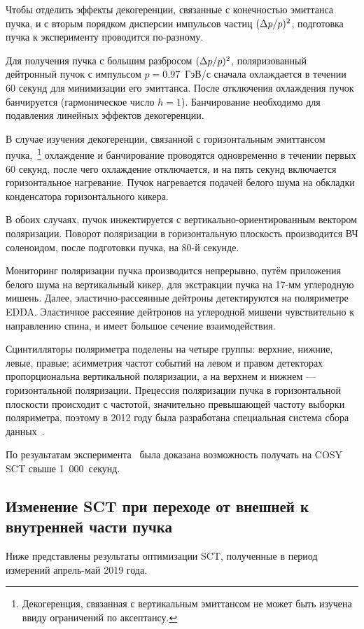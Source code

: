 Чтобы отделить эффекты декогеренции, связанные с конечностью эмиттанса пучка, и с вторым порядком дисперсии импульсов частиц $(\Delta p/p)^2$, подготовка пучка к эксперименту проводится по-разному.

Для получения пучка с большим разбросом $(\Delta p/p)^2$, поляризованный дейтронный пучок с импульсом $p=0.97$~ГэВ/с сначала охлаждается в течении 60 секунд для минимизации его эмиттанса. После отключения охлаждения пучок банчируется (гармоническое число $h=1$). Банчирование необходимо для подавления линейных эффектов декогеренции.

В случае изучения декогеренции, связанной с горизонтальным эмиттансом пучка,~\footnote{Декогеренция, связанная с вертикальным эмиттансом не может быть изучена ввиду ограничений по аксептансу.} охлаждение и банчирование проводятся одновременно в течении первых 60 секунд, после чего охлаждение отключается, и на пять секунд включается горизонтальное нагревание. Пучок нагревается подачей белого шума на обкладки конденсатора горизонтального кикера.

В обоих случаях, пучок инжектируется с вертикально-ориентированным вектором поляризации. Поворот поляризации в горизонтальную плоскость производится ВЧ соленоидом, после подготовки пучка, на 80-й секунде.

Мониторинг поляризации пучка производится непрерывно, путём приложения белого шума на вертикальный кикер, для экстракции пучка на 17-мм углеродную мишень. Далее, эластично-рассеянные дейтроны детектируются на поляриметре EDDA. Эластичное рассеяние дейтронов на углеродной мишени чувствительно к направлению спина, и имеет большое сечение взаимодействия. 

Сцинтилляторы поляриметра поделены на четыре группы: верхние, нижние, левые, правые; асимметрия частот событий на левом и правом детекторах пропорциональна вертикальной поляризации, а на верхнем и нижнем --- горизонтальной поляризации. Прецессия поляризации пучка в горизонтальной плоскости происходит с частотой, значительно превышающей частоту выборки поляриметра, поэтому в 2012 году была разработана специальная система сбора данных~\cite{COSY:DAQ}.

По результатам эксперимента~\cite{Guidoboni:STORI14} была доказана возможность получать на COSY SCT 
свыше 1~000~секунд. 

\subsection{Изменение SCT при переходе от внешней к внутренней части пучка}
Ниже представлены результаты оптимизации SCT, полученные в период измерений апрель-май 2019 года. 

